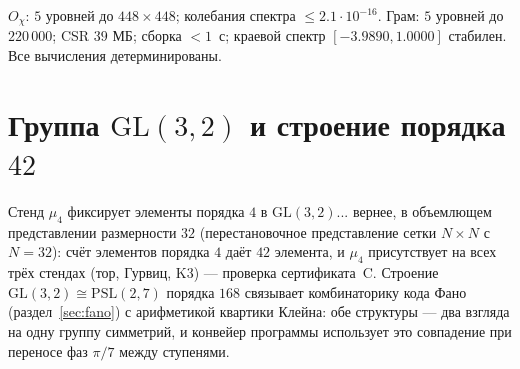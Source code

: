 \begin{databox}
$O_\chi$: $5$ уровней до $448\times448$; колебания спектра
$\le2.1\cdot10^{-16}$. Грам: $5$ уровней до $220\,000$; CSR
$39$ МБ; сборка $<1$~с; краевой спектр $[-3.9890,1.0000]$
стабилен. Все вычисления детерминированы.
\end{databox}

\section{Группа $\mathrm{GL}(3,2)$ и строение порядка $42$}
\label{sec:gl32}

Стенд $\mu_4$ фиксирует элементы порядка $4$ в
$\mathrm{GL}(3,2)$... вернее, в объемлющем представлении
размерности $32$ (перестановочное представление сетки
$N\times N$ с $N=32$): счёт элементов порядка $4$ даёт $42$
элемента, и $\mu_4$ присутствует на всех трёх стендах
(тор, Гурвиц, K3) --- проверка сертификата~C. Строение
$\mathrm{GL}(3,2)\cong\mathrm{PSL}(2,7)$ порядка $168$ связывает
комбинаторику кода Фано (раздел~\ref{sec:fano}) с арифметикой
квартики Клейна: обе структуры --- два взгляда на одну группу
симметрий, и конвейер программы использует это совпадение при
переносе фаз $\pi/7$ между ступенями.
